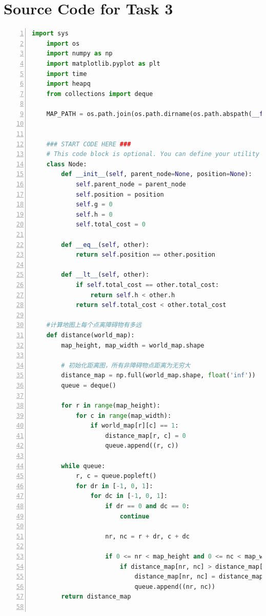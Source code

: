 \documentclass[aps,letterpaper,10pt]{revtex4}
\begin{document}
\newpage
    \section{Source Code for Task 3}
    \label{sec:appendix_task3}
    
    \begin{lstlisting}[language=Python, caption={Source Code for Task 1 (5-Task\_1.py)}, label={lst:task1_code}, basicstyle=\ttfamily\small, numbers=left, frame=tb, breaklines=true]
    import sys
    import os
    import numpy as np
    import matplotlib.pyplot as plt
    import time
    import heapq
    from collections import deque
    
    MAP_PATH = os.path.join(os.path.dirname(os.path.abspath(__file__)), '3-map/map.npy')
    
    
    ### START CODE HERE ###
    # This code block is optional. You can define your utility function and class in this block if necessary.
    class Node:
        def __init__(self, parent_node=None, position=None):
            self.parent_node = parent_node
            self.position = position
            self.g = 0 
            self.h = 0     
            self.total_cost = 0       
    
        def __eq__(self, other):
            return self.position == other.position
        
        def __lt__(self, other):
            if self.total_cost == other.total_cost:
                return self.h < other.h
            return self.total_cost < other.total_cost
    
    #计算地图上每个点离障碍物有多远
    def distance(world_map):
        map_height, map_width = world_map.shape
    
        # 初始化距离图，所有非障碍物点距离为无穷大
        distance_map = np.full(world_map.shape, float('inf'))
        queue = deque()
    
        for r in range(map_height):
            for c in range(map_width):
                if world_map[r][c] == 1:
                    distance_map[r, c] = 0
                    queue.append((r, c))
    
        while queue:
            r, c = queue.popleft()
            for dr in [-1, 0, 1]:
                for dc in [-1, 0, 1]:
                    if dr == 0 and dc == 0:
                        continue
                    
                    nr, nc = r + dr, c + dc
    
                    if 0 <= nr < map_height and 0 <= nc < map_width:
                        if distance_map[nr, nc] > distance_map[r, c] + 1:
                            distance_map[nr, nc] = distance_map[r, c] + 1
                            queue.append((nr, nc))
        return distance_map
    

\end{lstlisting}
\end{document}
